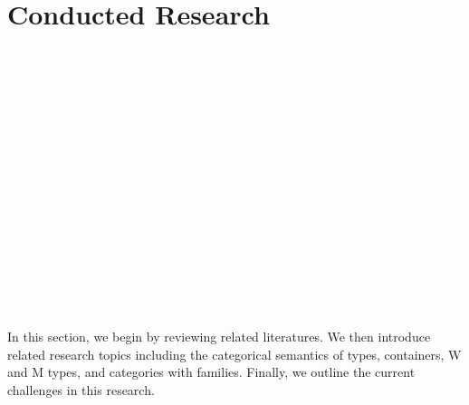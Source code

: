 \chapter{Conducted Research}

\begin{code}[hide]%
\>[0]\AgdaSymbol{\{-\#}\AgdaSpace{}%
\AgdaSpace{}%
\AgdaSpace{}%
\AgdaSymbol{\#-\}}\<%
\\
%
\\[\AgdaEmptyExtraSkip]%
\>[0]\AgdaSpace{}%
\AgdaSpace{}%
\<%
\\
\>[0]\AgdaSpace{}%
\AgdaSpace{}%
\<%
\\
\>[0]\AgdaSpace{}%
\AgdaSpace{}%
\<%
\\
\>[0]\AgdaSpace{}%
\AgdaSpace{}%
\<%
\\
\>[0]\AgdaSpace{}%
\AgdaSpace{}%
\<%
\\
\>[0]\AgdaSpace{}%
\AgdaSpace{}%
\<%
\\
%
\\[\AgdaEmptyExtraSkip]%
\>[0]\AgdaSpace{}%
\AgdaSymbol{:}\AgdaSpace{}%
\<%
\\
\>[0]\AgdaSpace{}%
\AgdaSymbol{=}\AgdaSpace{}%
\<%
\\
%
\\[\AgdaEmptyExtraSkip]%
\>[0]\AgdaSpace{}%
\AgdaSymbol{:}\AgdaSpace{}%
\<%
\\
\>[0]\AgdaSpace{}%
\AgdaSymbol{=}\AgdaSpace{}%
\<%
\\
%
\\[\AgdaEmptyExtraSkip]%
\>[0]\AgdaSpace{}%
\AgdaSpace{}%
\AgdaSpace{}%
\AgdaSpace{}%
\AgdaSymbol{:}\AgdaSpace{}%
\<%
\end{code}

In this section, we begin by reviewing related literatures. We then introduce related research topics including the categorical semantics of types, containers, W and M types, and categories with families. Finally, we outline the current challenges in this research.

